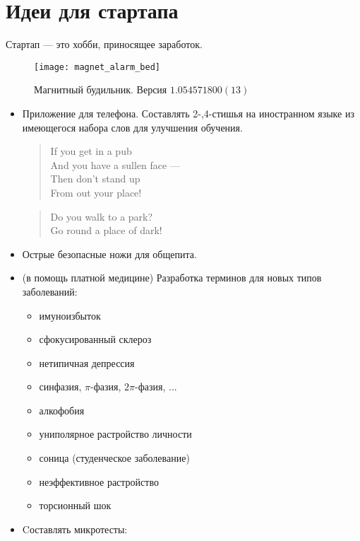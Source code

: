 \section{Идеи для стартапа}
Стартап --- это хобби, приносящее заработок.

\begin{figure}[ht!]
    \centering
    \texttt{[image: magnet\_alarm\_bed]}
    \caption{Магнитный будильник. Версия \( 1.054571800(13) \)}
\end{figure}

\begin{itemize}
\item Приложение для телефона. Составлять 2-,4-стишья на иностранном языке из имеющегося набора слов для улучшения обучения.\\
\begin{flushleft}
\begin{verse}
If you get in a pub\\
And you have a sullen face ---\\
Then don't stand up\\
From out your place!
\end{verse}

\begin{verse}
Do you walk to a park?\\
Go round a place of dark!
\end{verse}
\end{flushleft}
\item Острые безопасные ножи для общепита.

\item (в помощь платной медицине) Разработка терминов для новых типов заболеваний:
    \begin{itemize}
        \item имуноизбыток
        \item сфокусированный склероз
        \item нетипичная депрессия
        \item синфазия, $\pi$-фазия, $2\pi$-фазия, ...
        \item алкофобия
        \item униполярное растройство личности
        \item соница (студенческое заболевание)
        \item неэффективное растройство
        \item торсионный шок
    \end{itemize}
\item Cоставлять микротесты:



\end{itemize}

